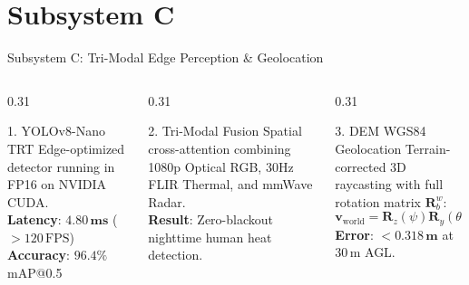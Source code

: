 \documentclass[aspectratio=169, 10pt]{beamer}
\begin{document}
\section{Subsystem C}
\begin{frame}{Subsystem C: Tri-Modal Edge Perception \& Geolocation}
  \begin{columns}[T]
    \begin{column}{0.31\textwidth}
      \begin{defensecard}{1. YOLOv8-Nano TRT}
        {\tiny
          Edge-optimized detector running in FP16 on NVIDIA CUDA.
          \vspace{0.1cm}\\
          \textbf{Latency}: $\mathbf{4.80\,\text{ms}}$ ($>120\,\text{FPS}$)\\
          \textbf{Accuracy}: $\mathbf{96.4\%}$ mAP@0.5
        }
      \end{defensecard}
    \end{column}

    \begin{column}{0.31\textwidth}
      \begin{defensecard}{2. Tri-Modal Fusion}
        {\tiny
          Spatial cross-attention combining 1080p Optical RGB, 30Hz FLIR Thermal, and mmWave Radar.
          \vspace{0.1cm}\\
          \textbf{Result}: Zero-blackout nighttime human heat detection.
        }
      \end{defensecard}
    \end{column}

    \begin{column}{0.31\textwidth}
      \begin{highlightcard}{3. DEM WGS84 Geolocation}
        {\tiny
          Terrain-corrected 3D raycasting with full rotation matrix $\mathbf{R}_b^w$:
          $$\mathbf{v}_{\text{world}} = \mathbf{R}_z(\psi) \mathbf{R}_y(\theta) \mathbf{R}_x(\phi) \mathbf{v}_{\text{cam}}$$
          \textbf{Error}: $<\mathbf{0.318\,\text{m}}$ at $30\,\text{m}$ AGL.
        }
      \end{highlightcard}
    \end{column}
  \end{columns}
\end{frame}
\end{document}
